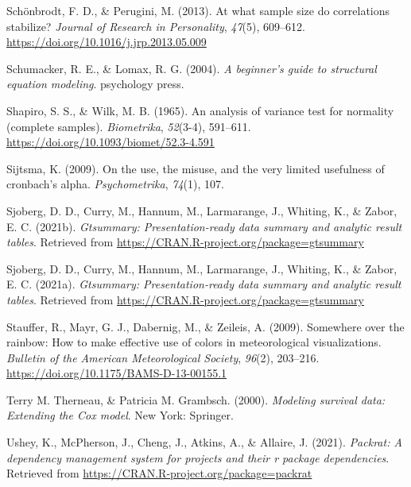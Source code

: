 \documentclass[
  english,
  man]{apa6}
\newlength{\cslhangindent}
\newlength{\cslentryspacingunit} %
\newenvironment{CSLReferences}[2] %
 {%
  \setlength{\parindent}{0pt}
  \ifodd #1
  \let\oldpar\par
  \def\par{\hangindent=\cslhangindent\oldpar}
  \fi
  \setlength{\parskip}{#2\cslentryspacingunit}
 }%
 {}
\begin{document}
\begin{CSLReferences}{1}{0}
\leavevmode{}%
Schönbrodt, F. D., \& Perugini, M. (2013). At what sample size do correlations stabilize? \emph{Journal of Research in Personality}, \emph{47}(5), 609--612. \url{https://doi.org/10.1016/j.jrp.2013.05.009}

\leavevmode{}%
Schumacker, R. E., \& Lomax, R. G. (2004). \emph{A beginner's guide to structural equation modeling}. psychology press.

\leavevmode{}%
Shapiro, S. S., \& Wilk, M. B. (1965). An analysis of variance test for normality (complete samples). \emph{Biometrika}, \emph{52}(3-4), 591--611. \url{https://doi.org/10.1093/biomet/52.3-4.591}

\leavevmode{}%
Sijtsma, K. (2009). On the use, the misuse, and the very limited usefulness of cronbach's alpha. \emph{Psychometrika}, \emph{74}(1), 107.

\leavevmode{}%
Sjoberg, D. D., Curry, M., Hannum, M., Larmarange, J., Whiting, K., \& Zabor, E. C. (2021b). \emph{Gtsummary: Presentation-ready data summary and analytic result tables}. Retrieved from \url{https://CRAN.R-project.org/package=gtsummary}

\leavevmode{}%
Sjoberg, D. D., Curry, M., Hannum, M., Larmarange, J., Whiting, K., \& Zabor, E. C. (2021a). \emph{Gtsummary: Presentation-ready data summary and analytic result tables}. Retrieved from \url{https://CRAN.R-project.org/package=gtsummary}

\leavevmode{}%
Stauffer, R., Mayr, G. J., Dabernig, M., \& Zeileis, A. (2009). Somewhere over the rainbow: How to make effective use of colors in meteorological visualizations. \emph{Bulletin of the American Meteorological Society}, \emph{96}(2), 203--216. \url{https://doi.org/10.1175/BAMS-D-13-00155.1}

\leavevmode{}%
Terry M. Therneau, \& Patricia M. Grambsch. (2000). \emph{Modeling survival data: Extending the {C}ox model}. New York: Springer.

\leavevmode{}%
Ushey, K., McPherson, J., Cheng, J., Atkins, A., \& Allaire, J. (2021). \emph{Packrat: A dependency management system for projects and their r package dependencies}. Retrieved from \url{https://CRAN.R-project.org/package=packrat}


\end{CSLReferences}
\end{document}

